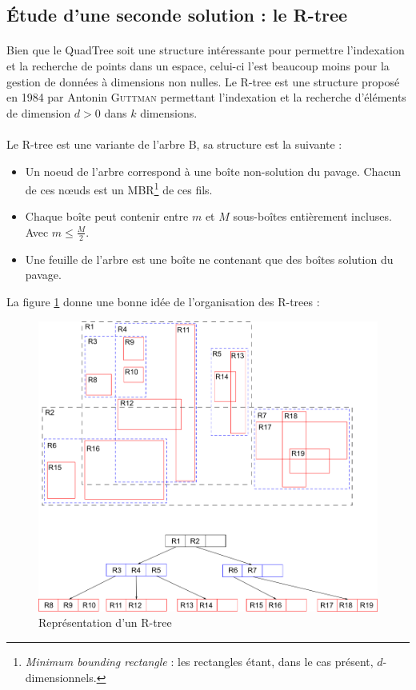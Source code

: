 \subsection{\'Etude d'une seconde solution : le R-tree}
\paragraph{}Bien que le QuadTree soit une structure intéressante pour permettre l'indexation et la recherche de points dans un espace, celui-ci l'est beaucoup moins pour la gestion de données à dimensions non nulles. Le R-tree est une structure proposé en 1984 par Antonin \textsc{Guttman} permettant l'indexation et la recherche d'éléments de dimension $d > 0$ dans $k$ dimensions\cite{Guttman}.

\paragraph{}Le R-tree est une variante de l'arbre B, sa structure est la suivante :
\begin{itemize}
 \item Un noeud de l'arbre correspond à une boîte non-solution du pavage. Chacun de ces nœuds est un MBR\footnote{\og \emph{Minimum bounding rectangle}\fg{} : les rectangles étant, dans le cas présent, $d$-dimensionnels.} de ces fils.
 \item Chaque boîte peut contenir entre $m$ et $M$ sous-boîtes entièrement incluses. Avec $m\leq \frac{M}{2}$.
 \item Une feuille de l'arbre est une boîte ne contenant que des boîtes solution du pavage.
\end{itemize}

La figure \ref{fig:rtree} donne une bonne idée de l'organisation des R-trees :
\begin{figure}[htbp]
\centering
\includegraphics[scale=0.50]{img/rtree}
\caption{Représentation d'un R-tree\cite{wiki}}
\label{fig:rtree}
\end{figure}

